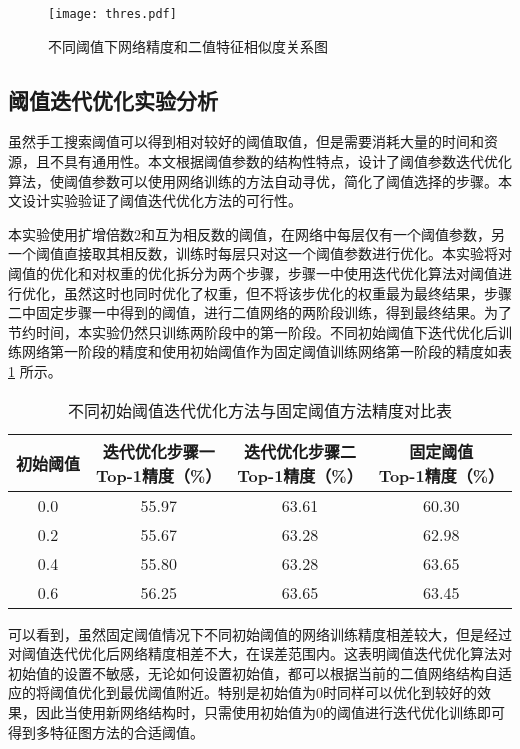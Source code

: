 \begin{figure}[htb]
  \centering
  \texttt{[image: thres.pdf]}
  \caption{不同阈值下网络精度和二值特征相似度关系图}
  \label{fig:thres}
\end{figure}

\subsection{阈值迭代优化实验分析}

虽然手工搜索阈值可以得到相对较好的阈值取值，但是需要消耗大量的时间和资源，且不具有通用性。本文根据阈值参数的结构性特点，设计了阈值参数迭代优化算法，使阈值参数可以使用网络训练的方法自动寻优，简化了阈值选择的步骤。本文设计实验验证了阈值迭代优化方法的可行性。

本实验使用扩增倍数2和互为相反数的阈值，在网络中每层仅有一个阈值参数，另一个阈值直接取其相反数，训练时每层只对这一个阈值参数进行优化。本实验将对阈值的优化和对权重的优化拆分为两个步骤，步骤一中使用迭代优化算法对阈值进行优化，虽然这时也同时优化了权重，但不将该步优化的权重最为最终结果，步骤二中固定步骤一中得到的阈值，进行二值网络的两阶段训练，得到最终结果。为了节约时间，本实验仍然只训练两阶段中的第一阶段。不同初始阈值下迭代优化后训练网络第一阶段的精度和使用初始阈值作为固定阈值训练网络第一阶段的精度如表 \ref{tab:5} 所示。

\begin{table}[htb]
  \vspace{6pt}
  \centering
  \caption{不同初始阈值迭代优化方法与固定阈值方法精度对比表}
  \label{tab:5}
  \begin{tabular}{cccc}
    \toprule
    初始阈值   & \makecell{迭代优化步骤一\\Top-1精度（\%）} & \makecell{迭代优化步骤二\\Top-1精度（\%）} & \makecell{固定阈值\\Top-1精度（\%）}\\
    \midrule
    0.0 & 55.97 & 63.61 & 60.30 \\
    0.2 & 55.67 & 63.28 & 62.98 \\
    0.4 & 55.80 & 63.28 & 63.65 \\
    0.6 & 56.25 & 63.65 & 63.45 \\
    \bottomrule
  \end{tabular}
  \vspace{6pt}
\end{table}

可以看到，虽然固定阈值情况下不同初始阈值的网络训练精度相差较大，但是经过对阈值迭代优化后网络精度相差不大，在误差范围内。这表明阈值迭代优化算法对初始值的设置不敏感，无论如何设置初始值，都可以根据当前的二值网络结构自适应的将阈值优化到最优阈值附近。特别是初始值为0时同样可以优化到较好的效果，因此当使用新网络结构时，只需使用初始值为0的阈值进行迭代优化训练即可得到多特征图方法的合适阈值。

